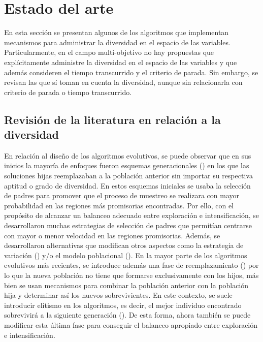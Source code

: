 
\section{Estado del arte}\label{sec:estado_arte}

En esta sección se presentan algunos de los algoritmos que implementan mecanismos para administrar la diversidad en el 
espacio de las variables.
%
Particularmente, en el campo multi-objetivo no hay propuestas que explícitamente administre la diversidad en el espacio de 
las variables y que además consideren el tiempo transcurrido y el criterio de parada.
%
Sin embargo, se revisan las que sí toman en cuenta la diversidad, aunque sin relacionarla con criterio de parada o tiempo 
transcurrido.

\subsection{Revisión de la literatura en relación a la diversidad}

En relación al diseño de los algoritmos evolutivos, se puede observar que en sus inicios la mayoría de enfoques fueron 
esquemas generacionales (\cite{de2006evolutionary}) en los que las soluciones hijas reemplazaban a la población anterior 
sin importar su respectiva aptitud o grado de diversidad.
%
En estos esquemas iniciales se usaba la selección de padres para promover que el proceso de muestreo se realizara con mayor 
probabilidad en las regiones más promisorias encontradas. 
%
Por ello, con el propósito de alcanzar un balanceo adecuado entre exploración e intensificación, se desarrollaron muchas 
estrategias de selección de padres que permitían centrarse con mayor o menor velocidad en las regiones promisorias.
%
Además, se desarrollaron alternativas que modifican otros aspectos como la estrategia de variación (\cite{Joel:herrera2003fuzzy}) y/o 
el modelo poblacional (\cite{alba2005parallel}).
%
En la mayor parte de los algoritmos evolutivos más recientes, se introduce además una fase de 
reemplazamiento (\cite{eiben2003introduction}) por lo que la nueva población no tiene que formarse exclusivamente con los hijos, 
más bien se usan mecanismos para combinar la población anterior con la población hija y determinar así los nuevos 
sobrevivientes.
%
En este contexto, se suele introducir elitismo en los algoritmos, es decir, el mejor individuo encontrado sobrevivirá a la 
siguiente generación (\cite{Joel:CHC}).
%
De esta forma, ahora también se puede modificar esta última fase para conseguir el balanceo apropiado entre exploración e 
intensificación.

